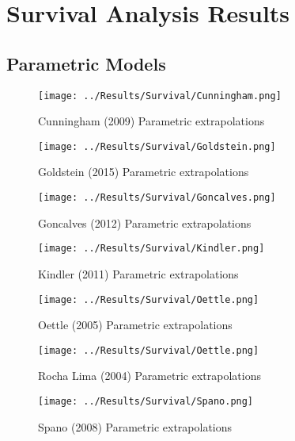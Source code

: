 \chapter{Survival Analysis Results}

\section{Parametric Models}

\begin{figure}
    \texttt{[image: ../Results/Survival/Cunningham.png]}
    \caption{Cunningham (2009) Parametric extrapolations}
    \label{fig:cunninghamParamExtrap}
\end{figure}

\begin{figure}
    \texttt{[image: ../Results/Survival/Goldstein.png]}
    \caption{Goldstein (2015) Parametric extrapolations}
    \label{fig:goldsteinParamExtrap}
\end{figure}

\begin{figure}
    \texttt{[image: ../Results/Survival/Goncalves.png]}
    \caption{Goncalves (2012) Parametric extrapolations}
    \label{fig:goncalvesParamExtrap}
\end{figure}

\begin{figure}
    \texttt{[image: ../Results/Survival/Kindler.png]}
    \caption{Kindler (2011) Parametric extrapolations}
    \label{fig:kindlerParamExtrap}
\end{figure}

\begin{figure}
    \texttt{[image: ../Results/Survival/Oettle.png]}
    \caption{Oettle (2005) Parametric extrapolations}
    \label{fig:oettleParamExtrap}
\end{figure}

\begin{figure}
    \texttt{[image: ../Results/Survival/Oettle.png]}
    \caption{Rocha Lima (2004) Parametric extrapolations}
    \label{fig:rochaLimaParamExtrap}
\end{figure}

\begin{figure}
    \texttt{[image: ../Results/Survival/Spano.png]}
    \caption{Spano (2008) Parametric extrapolations}
    \label{fig:spanoParamExtrap}
\end{figure}